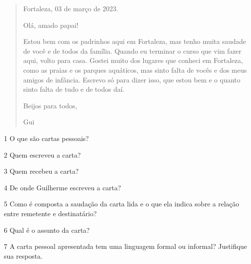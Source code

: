 \begin{quote}
\begin{flushright}
Fortaleza, 03 de março de 2023.
\end{flushright}

Olá, amado papai!

Estou bem com os padrinhos aqui em Fortaleza, mas tenho muita saudade de
você e de todos da família. Quando eu terminar o curso que vim fazer
aqui, volto para casa. Gostei muito dos lugares que conheci em
Fortaleza, como as praias e os parques aquáticos, mas sinto falta de
vocês e dos meus amigos de infância. Escrevo só para dizer isso, que
estou bem e o quanto sinto falta de tudo e de todos daí.

\begin{flushright}
Beijos para todos,

Gui
\end{flushright}
\end{quote}


\num{1} O que são cartas pessoais?


\num{2} Quem escreveu a carta?


\num{3} Quem recebeu a carta?


\num{4} De onde Guilherme escreveu a carta?


\num{5} Como é composta a saudação da carta lida e o que ela indica sobre a
relação entre remetente e destinatário?


\num{6} Qual é o assunto da carta?


\num{7} A carta pessoal apresentada tem uma linguagem formal ou informal?
Justifique sua resposta.

